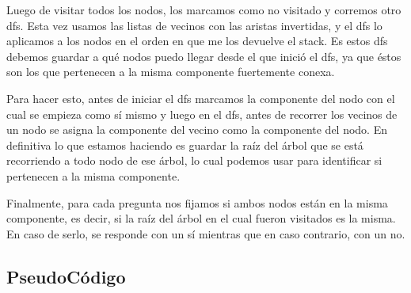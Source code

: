 Luego de visitar todos los nodos, los marcamos como no visitado y corremos otro dfs. Esta vez usamos las listas de vecinos con las aristas invertidas, y el dfs lo aplicamos a los nodos en el orden en que me los devuelve el stack. Es estos dfs debemos guardar a qué nodos puedo llegar desde el que inició el dfs, ya que éstos son los que pertenecen a la misma componente fuertemente conexa.\newline

Para hacer esto, antes de iniciar el dfs marcamos la componente del nodo con el cual se empieza como sí mismo y luego en el dfs, antes de recorrer los vecinos de un nodo se asigna la componente del vecino como la componente del nodo. En definitiva lo que estamos haciendo es guardar la raíz del árbol que se está recorriendo a todo nodo de ese árbol, lo cual podemos usar para identificar si pertenecen a la misma componente.\newline

Finalmente, para cada pregunta nos fijamos si ambos nodos están en la misma componente, es decir, si la raíz del árbol en el cual fueron visitados es la misma. En caso de serlo, se responde con un sí mientras que en caso contrario, con un no.\newline


\subsection{PseudoCódigo}


